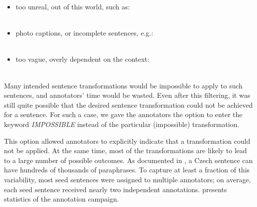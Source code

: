 \begin{itemize}
    \item too unreal, out of this world, such as: \\
           \\ 
    \item photo captions, or incomplete sentences, e.g.: \\
           \\
    \item too vague, overly dependent on the context: \\
           \\
\end{itemize}

Many intended sentence transformations would be impossible to apply to such sentences, and annotators' time would be wasted. Even after this filtering, it was still quite possible that the desired sentence transformation could not be achieved for a sentence. For such a case, we gave the annotators the option to enter the keyword \textit{IMPOSSIBLE} instead of the particular (impossible) transformation.

This option allowed annotators to explicitly indicate that a transformation could not be applied. At the same time, most of the transformations are likely to lead to a large number of possible outcomes. As documented in \cite{bojar-scratching}, a Czech sentence can have hundreds of thousands of paraphrases. To capture at least a fraction of this variability, most seed sentences were assigned to multiple annotators; on average, each seed sentence received nearly two independent annotations.  presents statistics of the annotation campaign.


